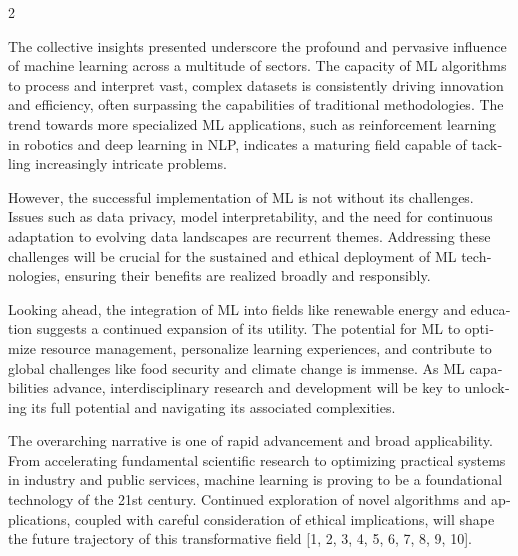 \documentclass[twoside]{article}
\newcommand{\timesfont}{\rmfamily}
\begin{document}
\begin{multicols}{2}
\timesfont
\begin{otherlanguage}{english}
The collective insights presented underscore the profound and pervasive influence of machine learning across a multitude of sectors. The capacity of ML algorithms to process and interpret vast, complex datasets is consistently driving innovation and efficiency, often surpassing the capabilities of traditional methodologies. The trend towards more specialized ML applications, such as reinforcement learning in robotics and deep learning in NLP, indicates a maturing field capable of tackling increasingly intricate problems.

However, the successful implementation of ML is not without its challenges. Issues such as data privacy, model interpretability, and the need for continuous adaptation to evolving data landscapes are recurrent themes. Addressing these challenges will be crucial for the sustained and ethical deployment of ML technologies, ensuring their benefits are realized broadly and responsibly.

Looking ahead, the integration of ML into fields like renewable energy and education suggests a continued expansion of its utility. The potential for ML to optimize resource management, personalize learning experiences, and contribute to global challenges like food security and climate change is immense. As ML capabilities advance, interdisciplinary research and development will be key to unlocking its full potential and navigating its associated complexities.

The overarching narrative is one of rapid advancement and broad applicability. From accelerating fundamental scientific research to optimizing practical systems in industry and public services, machine learning is proving to be a foundational technology of the 21st century. Continued exploration of novel algorithms and applications, coupled with careful consideration of ethical implications, will shape the future trajectory of this transformative field [1, 2, 3, 4, 5, 6, 7, 8, 9, 10].
\end{otherlanguage}

\vspace{6pt}

\par\vspace{4pt}


\end{multicols}
\end{document}
